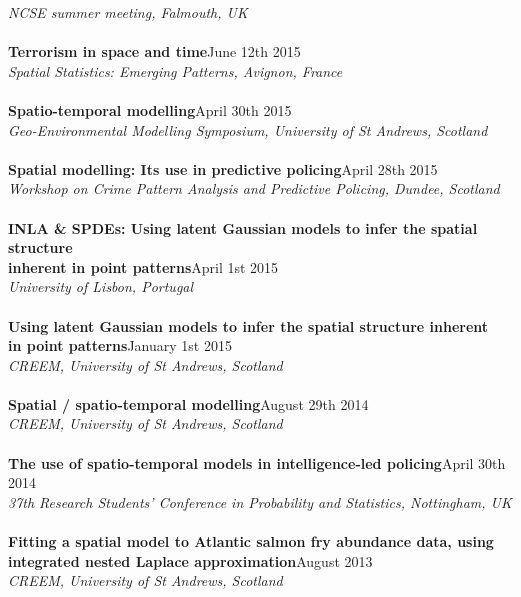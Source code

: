 \documentclass[10pt,letter]{article}
\begin{document}
 {\sl NCSE summer meeting, Falmouth, UK}\\
 \hdashrule[0.5ex]{4cm}{1pt}{1pt}\\
{\textbf{Terrorism in space and time}}\hfill June 12th 2015\\
 {\sl Spatial Statistics: Emerging Patterns, Avignon, France}\\
 \hdashrule[0.5ex]{4cm}{1pt}{1pt}\\
 {\textbf{Spatio-temporal modelling}}\hfill April 30th 2015\\
 {\sl Geo-Environmental Modelling Symposium, University of St Andrews, Scotland}\\
 \hdashrule[0.5ex]{4cm}{1pt}{1pt}\\
{\textbf{Spatial modelling: Its use in predictive policing}}\hfill April 28th 2015\\
{\sl Workshop on Crime Pattern Analysis and Predictive Policing, Dundee, Scotland}\\
\hdashrule[0.5ex]{4cm}{1pt}{1pt}\\
{\textbf{INLA \& SPDEs: Using latent Gaussian models to infer the spatial structure \\
inherent in point patterns}}\hfill April 1st 2015\\
 {\sl University of Lisbon, Portugal}\\
 \hdashrule[0.5ex]{4cm}{1pt}{1pt}\\
 {\textbf{Using latent Gaussian models to infer the spatial
structure inherent \\in point patterns}}\hfill January 1st 2015\\
 {\sl CREEM, University of St Andrews, Scotland}\\
 \hdashrule[0.5ex]{4cm}{1pt}{1pt}\\
 {\textbf{Spatial / spatio-temporal modelling}}\hfill August 29th 2014\\
 {\sl CREEM, University of St Andrews, Scotland}\\
 \hdashrule[0.5ex]{4cm}{1pt}{1pt}\\
{\textbf{The use of spatio-temporal models in intelligence-led policing}}\hfill  April 30th 2014\\
 {\sl 37th Research Students' Conference in Probability and Statistics, Nottingham, UK}\\
 \hdashrule[0.5ex]{4cm}{1pt}{1pt}\\
{\textbf{Fitting a spatial model to Atlantic salmon fry abundance data, using\\ integrated nested Laplace approximation}}\hfill  August 2013\\
 {\sl CREEM, University of St Andrews, Scotland}\\ 
\newpage
 \vspace{-1mm}
\end{document}

